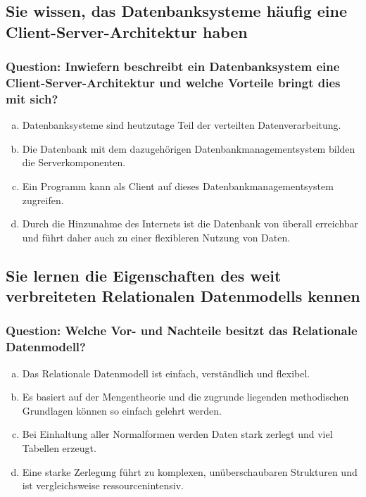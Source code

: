 \documentclass{article}
\begin{document}
\begin{adjustwidth}{2em}{2em}
\begin{adjustwidth}{2em}{2em}
			\subsection{Sie wissen, das Datenbanksysteme häufig eine Client-Server-Architektur haben}
			\begin{adjustwidth}{1em}{}
				\subsubsection*{Question: Inwiefern beschreibt ein Datenbanksystem eine Client-Server-Architektur und welche Vorteile bringt dies mit sich?}
				\begin{adjustwidth}{1em}{}
					\begin{enumerate}[(a)]
						\item Datenbanksysteme sind heutzutage Teil der verteilten Datenverarbeitung.
						\item Die Datenbank mit dem dazugehörigen Datenbankmanagementsystem bilden die Serverkomponenten.
						\item Ein Programm kann als Client auf dieses Datenbankmanagementsystem zugreifen.
						\item Durch die Hinzunahme des Internets ist die Datenbank von überall erreichbar und führt daher auch zu einer flexibleren Nutzung von Daten.
					\end{enumerate}
				\end{adjustwidth}
			\end{adjustwidth}
			\subsection{Sie lernen die Eigenschaften des weit verbreiteten Relationalen Datenmodells kennen}
			\begin{adjustwidth}{1em}{}
				\subsubsection*{Question: Welche Vor- und Nachteile besitzt das Relationale Datenmodell?}
				\begin{adjustwidth}{1em}{}
					\begin{enumerate}[(a)]
						\item Das Relationale Datenmodell ist einfach, verständlich und flexibel.
						\item Es basiert auf der Mengentheorie und die zugrunde liegenden methodischen Grundlagen können so einfach gelehrt werden.
						\item Bei Einhaltung aller Normalformen werden Daten stark zerlegt und viel Tabellen erzeugt.
						\item Eine starke Zerlegung führt zu komplexen, unüberschaubaren Strukturen und ist vergleichsweise ressourcenintensiv.
					\end{enumerate}
				\end{adjustwidth}
			\end{adjustwidth}

\end{adjustwidth}
\end{adjustwidth}
\end{document}
